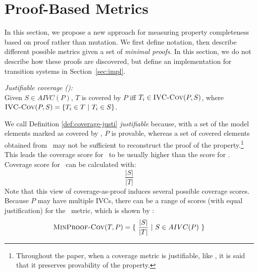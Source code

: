 \newcommand{\minproofcov}{\text{\sc MinProof-Cov}}


\section{Proof-Based Metrics}
\label{sec:method}

In this section, we propose a new approach for measuring property completeness based on proof rather than mutation.  We first define notation, then describe different possible metrics given a set of {\em minimal proofs}.  In this section, we do not describe how these proofs are discovered, but define an implementation for transition systems in Section~\ref{sec:impl}.

\begin{definition} {\emph{Justifiable coverage (\ivccov):}} \\
\label{def:coverage-justi}
Given $S \in AIVC(P)$, $T$ is covered by $P$ iff $T_i \in \text{\sc IVC-Cov} (P, S)$, where 
$\text{\sc IVC-Cov} (P, S) = \{ T_i \in T ~|~ T_i \in S \}$.
\end{definition}
\vspace{2mm}

%
We call Definition \ref{def:coverage-justi} \emph{justifiable} because, with a set of the model elements marked as covered by \ivccov, $P$ is provable, whereas a set of covered elements obtained from \nondetcov\ may not be sufficient to reconstruct the proof of the property.\footnote{Throughout the paper, when a coverage metric is justifiable, like \ivccov, it is said that it preserves provability of the property.}
This leads the coverage score for \ivccov\ to be usually higher than the score for \nondetcov. Coverage score for \ivccov\ can be calculated with: $$\frac{|S|}{|T|}$$ 
Note that this view of coverage-as-proof induces several possible coverage scores. Because $P$ may have multiple IVCs, there can be a range of scores (with equal justification) for the \ivccov\ metric, which is shown by \minproofcov:
\[
   \minproofcov(T, P) = \{~\frac{ |S|}{|T|}~|~S \in AIVC(P)~\}
\]

